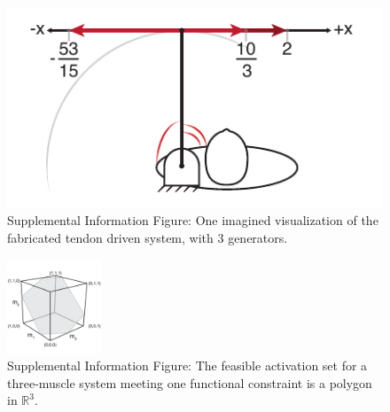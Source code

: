 \documentclass[10pt,letterpaper]{article}
\begin{document}
\begin{figure}[h]
  \label{fig:schematic_arm}
  \centering
  \includegraphics{supplemental_figures/schematic_arm_1D.pdf}
  \caption{Supplemental Information Figure: One imagined visualization of the fabricated tendon driven system, with 3 generators.}
\end{figure}
\begin{figure}[t]
  \label{fig:polygon_slice_solution_space}
  \centering
  \includegraphics[width=0.25\textwidth]{supplemental_figures/feasibleactivation.png}
  \caption{Supplemental Information Figure: The feasible activation set for a  three-muscle system meeting one functional constraint is a polygon in $\mathbb{R}^3$.} %
\end{figure}
\end{document}
